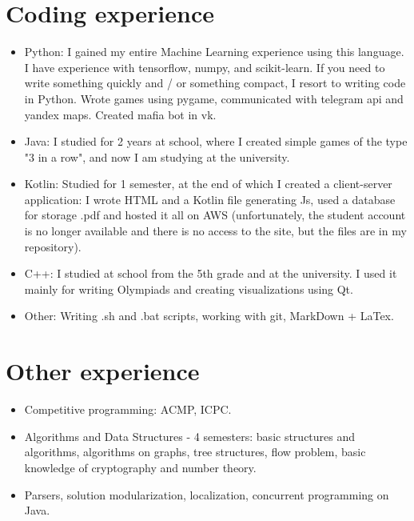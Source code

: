 \documentclass[letter]{deedy-resume}
\begin{document}
    \begin{minipage}[t]{0.6\textwidth}

        \section{Coding experience}

        \begin{itemize}[leftmargin=1em]
            \setlength\itemsep{0em}
            \item Python: I gained my entire Machine Learning experience using this language.
            I have experience with tensorflow, numpy, and scikit-learn.
            If you need to write something quickly and / or something compact, I resort to writing code in Python.
            Wrote games using pygame, communicated with telegram api and yandex maps.
            Created mafia bot in vk.
            \item Java: I studied for 2 years at school, where I created simple games of the type "3 in a row",
            and now I am studying at the university.
            \item Kotlin: Studied for 1 semester, at the end of which I created a client-server application:
            I wrote HTML and a Kotlin file generating Js, used a database for storage .pdf and hosted it all on AWS
            (unfortunately, the student account is no longer available and there is no access to the site,
            but the files are in my repository).
            \item C++: I studied at school from the 5th grade and at the university.
            I used it mainly for writing Olympiads and creating visualizations using Qt.
            \item Other: Writing .sh and .bat scripts, working with git, MarkDown + LaTex.
        \end{itemize}

        \sectionspace %


        \section{Other experience}

        \begin{itemize}[leftmargin=1em]
            \setlength\itemsep{0em}
            \item Competitive programming: ACMP,  ICPC.
            \item Algorithms and Data Structures - 4 semesters: basic structures and algorithms,
            algorithms on graphs, tree structures, flow problem, basic knowledge of cryptography and number theory.
            \item Parsers, solution modularization, localization, concurrent programming on Java.
        \end{itemize}


\end{minipage}
\end{document}
